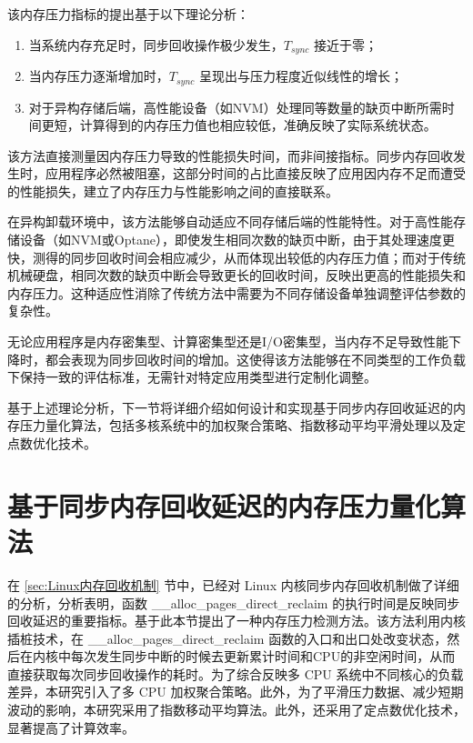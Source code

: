该内存压力指标的提出基于以下理论分析：

\begin{enumerate}
    \item 当系统内存充足时，同步回收操作极少发生，\(T_{sync}\) 接近于零；
    \item 当内存压力逐渐增加时，\(T_{sync}\) 呈现出与压力程度近似线性的增长；
    \item 对于异构存储后端，高性能设备（如NVM）处理同等数量的缺页中断所需时间更短，计算得到的内存压力值也相应较低，准确反映了实际系统状态。
\end{enumerate}

该方法直接测量因内存压力导致的性能损失时间，而非间接指标。同步内存回收发生时，应用程序必然被阻塞，这部分时间的占比直接反映了应用因内存不足而遭受的性能损失，建立了内存压力与性能影响之间的直接联系。

在异构卸载环境中，该方法能够自动适应不同存储后端的性能特性。对于高性能存储设备（如NVM或Optane），即使发生相同次数的缺页中断，由于其处理速度更快，测得的同步回收时间会相应减少，从而体现出较低的内存压力值；而对于传统机械硬盘，相同次数的缺页中断会导致更长的回收时间，反映出更高的性能损失和内存压力。这种适应性消除了传统方法中需要为不同存储设备单独调整评估参数的复杂性。

无论应用程序是内存密集型、计算密集型还是I/O密集型，当内存不足导致性能下降时，都会表现为同步回收时间的增加。这使得该方法能够在不同类型的工作负载下保持一致的评估标准，无需针对特定应用类型进行定制化调整。

基于上述理论分析，下一节将详细介绍如何设计和实现基于同步内存回收延迟的内存压力量化算法，包括多核系统中的加权聚合策略、指数移动平均平滑处理以及定点数优化技术。

\section{基于同步内存回收延迟的内存压力量化算法}
\label{sec:基于同步内存回收延迟的内存压力量化算法}

在 \ref{sec:Linux内存回收机制} 节中，已经对 Linux 内核同步内存回收机制做了详细的分析，分析表明，函数 \_\_alloc\_pages\_direct\_reclaim 的执行时间是反映同步回收延迟的重要指标。基于此本节提出了一种内存压力检测方法。该方法利用内核插桩技术，在 \_\_alloc\_pages\_direct\_reclaim 函数的入口和出口处改变状态，然后在内核中每次发生同步中断的时候去更新累计时间和CPU的非空闲时间，从而直接获取每次同步回收操作的耗时。为了综合反映多  CPU  系统中不同核心的负载差异，本研究引入了多  CPU  加权聚合策略。此外，为了平滑压力数据、减少短期波动的影响，本研究采用了指数移动平均算法。此外，还采用了定点数优化技术，显著提高了计算效率。

